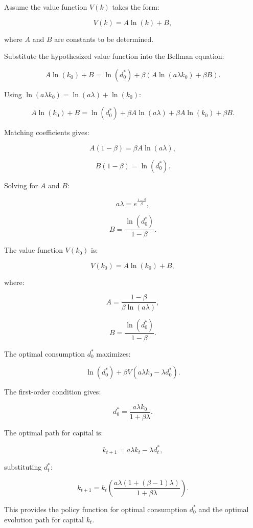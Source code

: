 \documentclass[12pt]{report}
\begin{document}
  Assume the value function \( V(k) \) takes the form:
  
  \[
  V(k) = A \ln(k) + B,
  \]
  
  where \( A \) and \( B \) are constants to be determined.
  
  Substitute the hypothesized value function into the Bellman equation:
  
  \[
  A \ln(k_0) + B = \ln(d_0^*) + \beta (A \ln(a \lambda k_0) + \beta B).
  \]
  
  Using \( \ln(a \lambda k_0) = \ln(a \lambda) + \ln(k_0) \):
  
  \[
  A \ln(k_0) + B = \ln(d_0^*) + \beta A \ln(a \lambda) + \beta A \ln(k_0) + \beta B.
  \]
  
  Matching coefficients gives:
  
  \[
  A (1 - \beta) = \beta A \ln(a \lambda),
  \]
  
  \[
  B (1 - \beta) = \ln(d_0^*).
  \]
  
  Solving for \( A \) and \( B \):
  
  \[
  a \lambda = e^{\frac{1 - \beta}{\beta}},
  \]
  
  \[
  B = \frac{\ln(d_0^*)}{1 - \beta}.
  \]
  
  The value function \( V(k_0) \) is:
  
  \[
  V(k_0) = A \ln(k_0) + B,
  \]
  
  where:
  
  \[
  A = \frac{1 - \beta}{\beta \ln(a \lambda)},
  \]
  
  \[
  B = \frac{\ln(d_0^*)}{1 - \beta}.
  \]
  
  The optimal consumption \( d_0^* \) maximizes:
  
  \[
  \ln(d_0^*) + \beta V(a \lambda k_0 - \lambda d_0^*).
  \]
  
  The first-order condition gives:
  
  \[
  d_0^* = \frac{a \lambda k_0}{1 + \beta \lambda}.
  \]
  
  The optimal path for capital is:
  
  \[
  k_{t+1} = a \lambda k_t - \lambda d_t^*,
  \]
  
  substituting \( d_t^* \):
  
  \[
  k_{t+1} = k_t \left( \frac{a \lambda (1 + (\beta - 1) \lambda)}{1 + \beta \lambda} \right).
  \]
  
  This provides the policy function for optimal consumption \( d_0^* \) and the optimal evolution path for capital \( k_t \).
  
 
\end{document}
